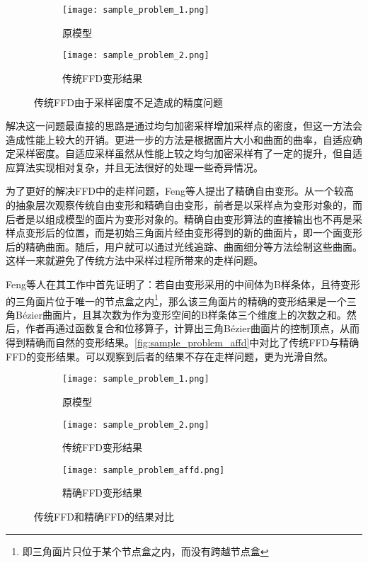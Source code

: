 \begin{figure}[htbp]
	\centering
	\begin{subfigure}[b]{.4\textwidth}
		\centering
		\texttt{[image: sample\_problem\_1.png]}
		\caption{原模型}\label{subfig:sample_problem_0}
	\end{subfigure}
	\quad
	\begin{subfigure}[b]{.4\textwidth}
		\centering
		\texttt{[image: sample\_problem\_2.png]}
		\caption{传统FFD变形结果}\label{subfig:sample_problem_1}
	\end{subfigure}
    \caption{传统FFD由于采样密度不足造成的精度问题\cite{Cui15}}\label{fig:sample_problem}
\end{figure}

    解决这一问题最直接的思路是通过均匀加密采样增加采样点的密度，但这一方法会造成性能上较大的开销。更进一步的方法是根据面片大小和曲面的曲率，自适应确定采样密度\cite{parry1986, gain1999, griessmair1989deformation}。自适应采样虽然从性能上较之均匀加密采样有了一定的提升，但自适应算法实现相对复杂，并且无法很好的处理一些奇异情况。

    为了更好的解决FFD中的走样问题，Feng等人提出了精确自由变形\cite{Feng98}。从一个较高的抽象层次观察传统自由变形和精确自由变形，前者是以采样点为变形对象的，而后者是以组成模型的面片为变形对象的。精确自由变形算法的直接输出也不再是采样点变形后的位置，而是初始三角面片经由变形得到的新的曲面片，即一个面变形后的精确曲面。随后，用户就可以通过光线追踪、曲面细分等方法绘制这些曲面。这样一来就避免了传统方法中采样过程所带来的走样问题。

    Feng等人在其工作中首先证明了：若自由变形采用的中间体为B样条体，且待变形的三角面片位于唯一的节点盒之内\footnote{即三角面片只位于某个节点盒之内，而没有跨越节点盒}，那么该三角面片的精确的变形结果是一个三角Bézier曲面片，且其次数为作为变形空间的B样条体三个维度上的次数之和。然后，作者再通过函数复合\cite{derose1988, derose1993}和位移算子\cite{chang1984}，计算出三角Bézier曲面片的控制顶点，从而得到精确而自然的变形结果。\autoref{fig:sample_problem_affd}中对比了传统FFD与精确FFD的变形结果。可以观察到后者的结果不存在走样问题，更为光滑自然。

\begin{figure}[htbp]
	\centering
	\begin{subfigure}[b]{.3\textwidth}
		\centering
		\texttt{[image: sample\_problem\_1.png]}
		\caption{原模型}
	\end{subfigure}
	\quad
	\begin{subfigure}[b]{.3\textwidth}
		\centering
		\texttt{[image: sample\_problem\_2.png]}
		\caption{传统FFD变形结果}
	\end{subfigure}
	\quad
	\begin{subfigure}[b]{.3\textwidth}
		\centering
		\texttt{[image: sample\_problem\_affd.png]}
		\caption{精确FFD变形结果}
	\end{subfigure}
    \caption{传统FFD和精确FFD的结果对比\cite{Cui15}}\label{fig:sample_problem_affd}
\end{figure}

